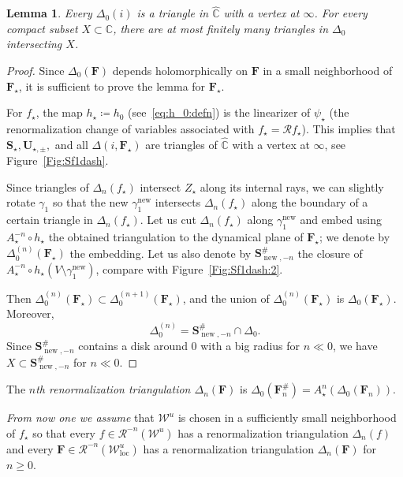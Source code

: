 \documentclass{amsart}
\newcommand{\1}{{\mathbb 1 }}
\newcommand\hC{{\widehat{\mathbb C}}}
\newcommand{\bDelta}{{\mathbb{\Delta}}}
\newcommand\RR{\mathcal{R}}
\newcommand{\bF}{{\mathbf F}}
\newcommand{\bS}{{\mathbf S}}
\newcommand{\bU}{{\mathbf U}}
\newcommand{\str}{{\star}}
\def\loc{{\mathrm{loc}}}
\newcommand\WW{\mathcal{W}}
\newcommand\UnstLoc{{\boldsymbol{\mathcal{W}}^u_\loc}}
\newcommand\new{{\operatorname{new}}}
\newcommand{\wC}{\widehat{\mathbb{C}}}
\newcommand{\C}{\mathbb{C}}
\newtheorem{lem}[thm]{Lemma}
\theoremstyle{remark}
\numberwithin{equation}{section}
\theoremstyle{definition}
\theoremstyle{nonumberbreak}
\begin{document}
\begin{lem}
Every $\Delta_0(i)$ is a triangle in $\hC$ with a vertex at $\infty$. For every compact subset $X\subset \C$, there are at most finitely many triangles in $\bDelta_0$ intersecting $X$.  
\end{lem}
\begin{proof}
Since $\bDelta_0(\bF)$ depends holomorphically on $\bF$ in a small neighborhood of $\bF_\str$, it is sufficient to prove the lemma for $\bF_\str$.

For $f_\str$, the map $h_\str\coloneqq h_0$ (see~\eqref{eq:h_0:defn}) is the linearizer of $\psi_\str$ (the renormalization change of variables associated with $f_\str=\RR f_\str$). This implies that $\bS_\str,\bU_{\str,\pm}, $ and all $\Delta(i,\bF_\str)$ are triangles of $\wC$ with a vertex at $\infty$, see Figure~\ref{Fig:Sf1dash}. 


Since triangles of $\bDelta_n(f_\str)$ intersect $Z_\str$ along its internal rays, we can slightly rotate $\gamma_1$ so that the new $\gamma_1^\new$ intersects $\bDelta_n(f_\str)$ along the boundary of a certain triangle in $\bDelta_n(f_\str)$. Let us cut $\bDelta_n(f_\str)$ along $\gamma_1^\new$ and embed using $A_\str^{-n} \circ h_{\str}$ the obtained triangulation to the dynamical plane of $\bF_\str$; we denote by $\bDelta^{(n)}_0(\bF_\str)$ the embedding. Let us also denote by $\bS^\#_{\new, -n}$ the closure of $A_\str^{-n} \circ h_{\str}(V\setminus \gamma_1^\new)$, compare with Figure~\ref{Fig:Sf1dash:2}.

Then $\bDelta^{(n)}_0(\bF_\str)\subset \bDelta^{(n+1)}_0(\bF_\str)$, and the union of $\bDelta^{(n)}_0(\bF_\str)$ is $\bDelta_0(\bF_\str)$. Moreover, \[\bDelta_0^{(n)}= \bS^\#_{\new,-n}\cap \bDelta_0.\] Since $\bS^\#_{\new,-n}$ contains a disk around $0$ with a big radius for $n\ll 0$, we have $X\subset \bS^\#_{\new,-n}$ for $n\ll 0$.
\end{proof}




The \emph{$n$th renormalization triangulation $\bDelta_n(\bF)$} is $\bDelta_0(\bF^\#_n)=A_\str^{n}(\bDelta_0(\bF_n))$.

\emph{From now one we assume} that $\WW^u$ is chosen in a sufficiently small neighborhood of $f_\str$ so that every $f\in \RR^{-n}(\WW^u)$ has a renormalization triangulation $\bDelta_n(f)$ and every $\bF\in \RR^{-n}(\UnstLoc)$ has a renormalization triangulation $\bDelta_n(\bF)$ for $n\ge0$. 
\end{document}
